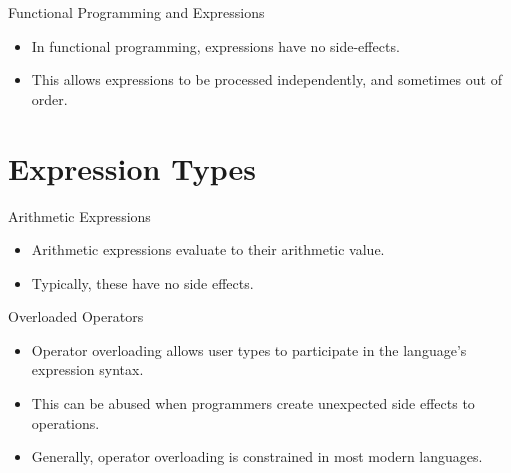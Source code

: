 \documentclass[handout]{beamer}
\newenvironment{code}{%
 \VerbatimEnvironment
 \begin{adjustbox}{max width=\textwidth, max height=0.7\textheight}
 \begin{BVerbatim}
  }{
  \end{BVerbatim}
 \end{adjustbox}
}
\begin{document}

\begin{frame}{Functional Programming and Expressions}
    \begin{itemize}
        \item In functional programming, expressions have no side-effects.
        \item This allows expressions to be processed independently, and sometimes out of order.
    \end{itemize}
\end{frame}

\section{Expression Types}

\begin{frame}{Arithmetic Expressions}
    \begin{itemize}
        \item Arithmetic expressions evaluate to their arithmetic value.
        \item Typically, these have no side effects.
    \end{itemize}
\end{frame}

\begin{frame}{Overloaded Operators}
    \begin{itemize}
        \item Operator overloading allows user types to participate in the language's expression syntax.
        \item This can be abused when programmers create unexpected side effects to operations.
        \item Generally, operator overloading is constrained in most modern languages.
    \end{itemize}
\end{frame}

\end{document}

